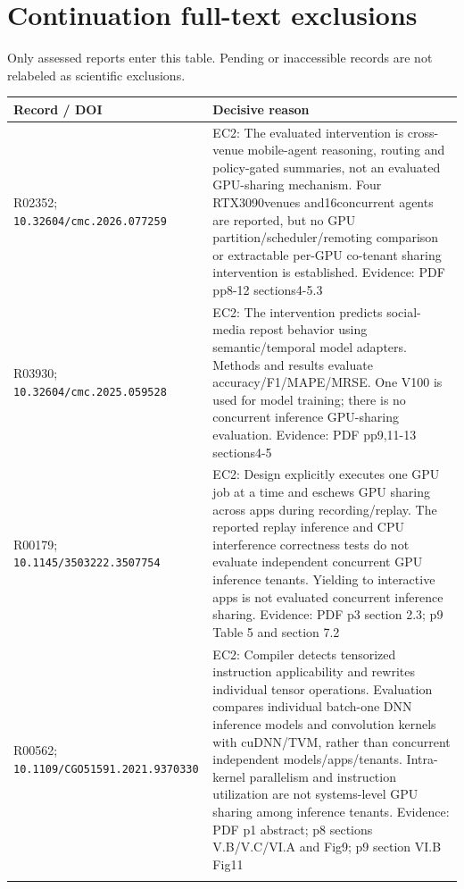 \section{Continuation full-text exclusions}
Only assessed reports enter this table. Pending or inaccessible records are not relabeled as scientific exclusions.
\begin{longtable}{>{\raggedright\arraybackslash}p{}>{\raggedright\arraybackslash}p{}}
\toprule
\textbf{Record / DOI} & \textbf{Decisive reason}\\\midrule\endhead
R02352; \nolinkurl{10.32604/cmc.2026.077259} & EC2: The evaluated intervention is cross-venue mobile-agent reasoning,\allowbreak{} routing and policy-gated summaries,\allowbreak{} not an evaluated GPU-sharing mechanism. Four RTX3090venues and16concurrent agents are reported,\allowbreak{} but no GPU partition/scheduler/remoting comparison or extractable per-GPU co-tenant sharing intervention is established. Evidence: PDF pp8-12 sections4-5.3\\\addlinespace
R03930; \nolinkurl{10.32604/cmc.2025.059528} & EC2: The intervention predicts social-media repost behavior using semantic/temporal model adapters. Methods and results evaluate accuracy/F1/MAPE/MRSE. One V100 is used for model training;\allowbreak{} there is no concurrent inference GPU-sharing evaluation. Evidence: PDF pp9,\allowbreak{}11-13 sections4-5\\\addlinespace
R00179; \nolinkurl{10.1145/3503222.3507754} & EC2: Design explicitly executes one GPU job at a time and eschews GPU sharing across apps during recording/replay. The reported replay inference and CPU interference correctness tests do not evaluate independent concurrent GPU inference tenants. Yielding to interactive apps is not evaluated concurrent inference sharing. Evidence: PDF p3 section 2.3;\allowbreak{} p9 Table 5 and section 7.2\\\addlinespace
R00562; \nolinkurl{10.1109/CGO51591.2021.9370330} & EC2: Compiler detects tensorized instruction applicability and rewrites individual tensor operations. Evaluation compares individual batch-one DNN inference models and convolution kernels with cuDNN/TVM,\allowbreak{} rather than concurrent independent models/apps/tenants. Intra-kernel parallelism and instruction utilization are not systems-level GPU sharing among inference tenants. Evidence: PDF p1 abstract;\allowbreak{} p8 sections V.B/V.C/VI.A and Fig9;\allowbreak{} p9 section VI.B Fig11\\\addlinespace
\bottomrule\end{longtable}

